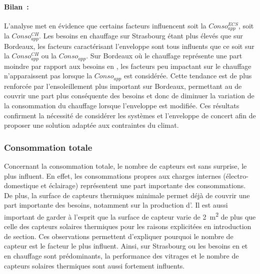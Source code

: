 \paragraph{Bilan~:} %
\label{par:bilan_conso_app}
L’analyse met en évidence que certains facteurs influencent soit la $Conso_{app}^{ECS}$,
soit la $Conso_{app}^{CH}$. Les besoins en chauffage sur Strasbourg étant plus
élevés que sur Bordeaux, les facteurs caractérisant l’enveloppe sont tous influents que
ce soit sur la $Conso_{app}^{CH}$ ou la $Conso_{app}$. Sur Bordeaux où le chauffage
représente une part moindre par rapport aux besoins en , les facteurs peu
impactant sur le chauffage n’apparaissent pas lorsque la $Conso_{app}$ est considérée.
Cette tendance est de plus renforcée par l’ensoleillement plus important sur Bordeaux,
permettant au  de couvrir une part plus conséquente des besoins et donc de diminuer
la variation de la consommation du chauffage lorsque l’enveloppe est modifiée. Ces
résultats confirment la nécessité de considérer les systèmes et l’enveloppe de concert
afin de proposer une solution adaptée aux contraintes du climat.


\subsubsection{Consommation totale} %
\label{ssub:consommation_totale}
Concernant la consommation totale, le nombre de capteurs  est sans surprise, le
plus influent. En effet, les consommations propres aux charges internes (électro-domestique
et éclairage) représentent une part importante des consommations. De plus, la
surface de capteurs thermiques minimale permet déjà de couvrir une part importante des
besoins, notamment sur la production d’. Il est aussi important de garder à
l’esprit que la surface de capteur  varie de \SI{2}{\metre\squared} de plus que
celle des capteurs solaires thermiques pour les raisons explicitées en introduction de
section. Ces observations permettent d’expliquer pourquoi le nombre de capteur 
est le facteur le plus influent. Ainsi, sur Strasbourg ou les besoins en  et
en chauffage sont prédominants, la performance des vitrages et le nombre de capteurs
solaires thermiques sont aussi fortement influents.


